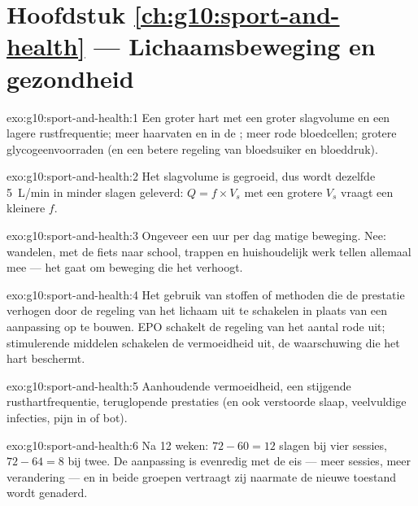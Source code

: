 \section*{Hoofdstuk \ref{ch:g10:sport-and-health} --- Lichaamsbeweging en gezondheid}

\begin{solution}{exo:g10:sport-and-health:1}
Een groter hart met een groter slagvolume en een lagere rustfrequentie;
meer haarvaten en  in de ; meer rode bloedcellen;
grotere glycogeenvoorraden (en een betere regeling van bloedsuiker en
bloeddruk).
\end{solution}

\begin{solution}{exo:g10:sport-and-health:2}
Het slagvolume is gegroeid, dus wordt dezelfde \qty{5}{L/min} in minder
slagen geleverd: $Q = f \times V_s$ met een grotere $V_s$ vraagt een
kleinere $f$.
\end{solution}

\begin{solution}{exo:g10:sport-and-health:3}
Ongeveer een uur per dag matige beweging. Nee: wandelen, met de fiets
naar school, trappen en huishoudelijk werk tellen allemaal mee --- het
gaat om beweging die het  verhoogt.
\end{solution}

\begin{solution}{exo:g10:sport-and-health:4}
Het gebruik van stoffen of methoden die de prestatie verhogen door de
regeling van het lichaam uit te schakelen in plaats van een aanpassing op
te bouwen. EPO schakelt de regeling van het aantal rode  uit;
stimulerende middelen schakelen de vermoeidheid uit, de waarschuwing die
het hart beschermt.
\end{solution}

\begin{solution}{exo:g10:sport-and-health:5}
Aanhoudende vermoeidheid, een stijgende rusthartfrequentie, teruglopende
prestaties (en ook verstoorde slaap, veelvuldige infecties, pijn in 
of bot).
\end{solution}

\begin{solution}{exo:g10:sport-and-health:6}
Na 12 weken: $72 - 60 = 12$ slagen bij vier sessies, $72 - 64 = 8$ bij
twee. De aanpassing is evenredig met de eis --- meer sessies, meer
verandering --- en in beide groepen vertraagt zij naarmate de nieuwe
toestand wordt genaderd.
\end{solution}

